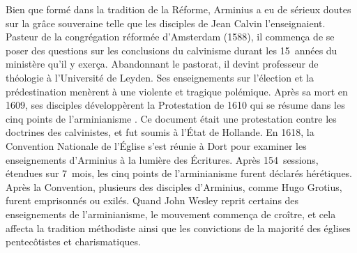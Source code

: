 \begin{specialpar}{}
Bien que formé dans la tradition de la Réforme, Arminius a eu de sérieux doutes
 sur \og la grâce souveraine \fg{}  telle que les disciples de Jean Calvin
 l'enseignaient. Pasteur de la congrégation réformée d'Amsterdam (1588),
 il commença de se poser des questions sur les conclusions du calvinisme
 durant les 15~années du ministère qu'il y exerça. Abandonnant le pastorat,
 il devint professeur de théologie à l'Université de Leyden.
 Ses enseignements sur l'élection et la prédestination menèrent à une violente
 et tragique polémique. Après sa mort en 1609, ses disciples développèrent la Protestation
 de 1610 qui se résume dans les \og cinq points de l'arminianisme \fg{}.
 Ce document était une protestation contre les doctrines des calvinistes,
 et fut soumis à l'État de Hollande. En 1618, la Con\-vention Nationale
 de l'Église s'est réunie à Dort pour examiner les enseignements d'Arminius
 à la lumière des Écritures. Après 154~sessions, étendues sur
 7~mois,
 les cinq points de l'arminianisme furent déclarés hérétiques.
 Après la
 Con\-ven\-tion, plusieurs des disciples d'Ar\-mi\-nius, comme Hugo Grotius,
 furent emprisonnés ou exilés. Quand John Wesley reprit certains des enseignements
 de l'armi\-nia\-nisme, le mouvement commença de croître, et cela affecta la tradition méthodiste
 ainsi que les convictions de la majorité des églises pentecôtistes et charismatiques.
\end{specialpar}


\closeintro

